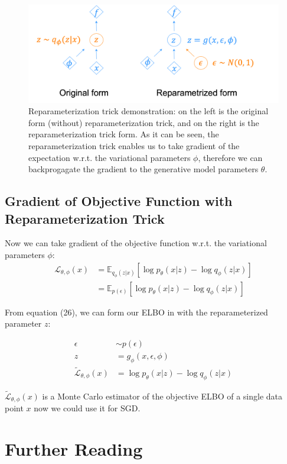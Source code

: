 \documentclass[11pt]{article}
\theoremstyle{definition}
\begin{document}
\begin{figure}[h]
\includegraphics*[width=\textwidth]{reparam.png}
\caption{Reparameterization trick demonstration: on the left is the original form (without) reparameterization trick, and on the right is the reparameterization trick form. As it can be seen, the reparameterization trick enables us to take gradient of the expectation w.r.t. the variational parameters $\phi$, therefore we can backprogagate the gradient to the generative model parameters $\theta$.}
\end{figure}

\subsection{Gradient of Objective Function with Reparameterization Trick}

Now we can take gradient of the objective function w.r.t. the variational parameters $\phi$:
\begin{align}
    \mathcal{L}_{\theta, \phi}(x) &= \mathbb{E}_{q_\phi(z|x)}[\log p_\theta(x|z) - \log q_\phi(z|x)]\\
    &= \mathbb{E}_{p(\epsilon)}[\log p_\theta(x|z) - \log q_\phi(z|x)]
\end{align}

From equation (26), we can form our ELBO in with the reparameterized parameter $z$:

\begin{align}
    \epsilon &\sim p(\epsilon)\\
    z &= g_\phi(x, \epsilon, \phi)\\
    \mathcal{\tilde{L}}_{\theta, \phi}(x) &= \log p_\theta(x|z) - \log q_\phi(z|x)
\end{align}

$\mathcal{\tilde{L}}_{\theta, \phi}(x)$ is a Monte Carlo estimator of the objective ELBO of a single data point $x$ now we could use it for SGD.

\section{Further Reading}
\end{document}
